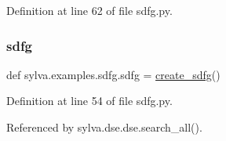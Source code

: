 Definition at line 62 of file sdfg.\+py.

\mbox{\label{namespacesylva_1_1examples_1_1sdfg_a007e0b3d2c0dab8288b9fdc29ce21b98}} 
\subsubsection{\texorpdfstring{sdfg}{sdfg}}
{\footnotesize\ttfamily def sylva.\+examples.\+sdfg.\+sdfg = \hyperlink{namespacesylva_1_1examples_1_1sdfg_ad4206a7c163d26bbbe8173a5f3dc9000}{create\+\_\+sdfg}()}



Definition at line 54 of file sdfg.\+py.



Referenced by sylva.\+dse.\+dse.\+search\+\_\+all().

